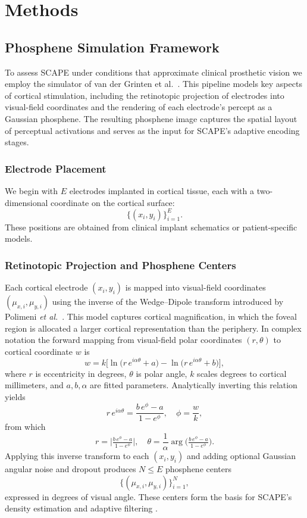 \section{Methods}

\subsection{Phosphene Simulation Framework}
To assess SCAPE under conditions that approximate clinical prosthetic vision we employ the simulator of van der Grinten et al.\ \cite{vanderGrinten2024}. This pipeline models key aspects of cortical stimulation, including the retinotopic projection of electrodes into visual-field coordinates and the rendering of each electrode’s percept as a Gaussian phosphene. The resulting phosphene image captures the spatial layout of perceptual activations and serves as the input for SCAPE’s adaptive encoding stages.


\subsubsection{Electrode Placement}
We begin with \(E\) electrodes implanted in cortical tissue, each with a two-dimensional coordinate on the cortical surface:
\[
\{(x_i,y_i)\}_{i=1}^E.
\]
These positions are obtained from clinical implant schematics or patient-specific models.


\subsubsection{Retinotopic Projection and Phosphene Centers}
Each cortical electrode \((x_i,y_i)\) is mapped into visual-field coordinates \((\mu_{x,i},\mu_{y,i})\) using the inverse of the Wedge–Dipole transform introduced by Polimeni \emph{et al.}\ \cite{Polimeni2006}. This model captures cortical magnification, in which the foveal region is allocated a larger cortical representation than the periphery. In complex notation the forward mapping from visual-field polar coordinates \((r,\theta)\) to cortical coordinate \(w\) is
\[
w = k\bigl[\ln\bigl(r\,e^{i\alpha\theta} + a\bigr) 
       - \ln\bigl(r\,e^{i\alpha\theta} + b\bigr)\bigr],
\]
where \(r\) is eccentricity in degrees, \(\theta\) is polar angle, \(k\) scales degrees to cortical millimeters, and \(a,b,\alpha\) are fitted parameters. Analytically inverting this relation yields
\[
r\,e^{i\alpha\theta}
  = \frac{b\,e^{\phi} - a}{1 - e^{\phi}},
\quad
\phi = \frac{w}{k},
\]
from which
\[
r = \bigl|\tfrac{b\,e^{\phi} - a}{1 - e^{\phi}}\bigr|,
\quad
\theta = \frac{1}{\alpha}\arg\!\bigl(\tfrac{b\,e^{\phi} - a}{1 - e^{\phi}}\bigr).
\]
Applying this inverse transform to each \((x_i,y_i)\) and adding optional Gaussian angular noise and dropout produces \(N\le E\) phosphene centers
\[
\{(\mu_{x,i},\mu_{y,i})\}_{i=1}^N,
\]
expressed in degrees of visual angle. These centers form the basis for SCAPE’s density estimation and adaptive filtering \cite{vanderGrinten2024}.



